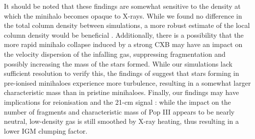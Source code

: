 \documentclass[../thesis.tex]{subfiles}
\begin{document}
It should be noted that these findings are somewhat sensitive to the density at which the minihalo becomes opaque to X-rays.  While we found no difference in the total column density between simulations, a more robust estimate of the local column density would be beneficial \citep[e.g.,][]{Hartwigetal2015, Safranek-Shraderetal2012}. Additionally, there is a possibility that the more rapid minihalo collapse induced by a strong CXB may have an impact on the velocity dispersion of the infalling gas, suppressing fragmentation and possibly increasing the mass of the stars formed. While our simulations lack sufficient resolution to verify this, the findings of \citet{Clarketal2011a} suggest that stars forming in pre-ionised minihaloes experience more turbulence, resulting in a somewhat larger characteristic mass than in pristine minihaloes. Finally, our findings may have implications for reionisation and the 21-cm signal \citep{FurlanettoPengBriggs2006, Mirocha2014}: while the impact on the number of fragments and characteristic mass of Pop III appears to be nearly neutral, low-density gas is still smoothed by X-ray heating, thus resulting in a lower IGM clumping factor.
\end{document}
